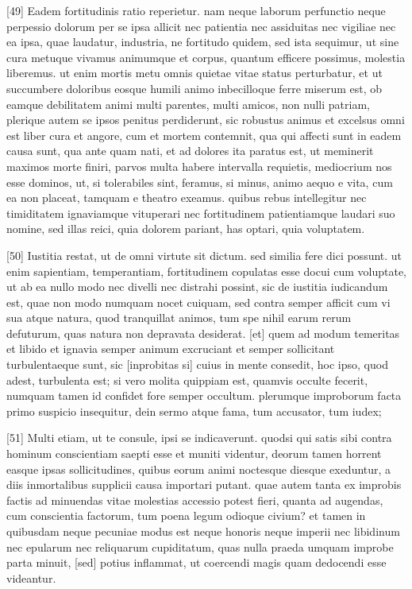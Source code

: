 \documentclass{article}
\begin{document}
[49] Eadem fortitudinis ratio reperietur. nam neque laborum perfunctio neque perpessio dolorum per se ipsa allicit nec patientia nec assiduitas nec vigiliae nec ea ipsa, quae laudatur, industria, ne fortitudo quidem, sed ista sequimur, ut sine cura metuque vivamus animumque et corpus, quantum efficere possimus, molestia liberemus. ut enim mortis metu omnis quietae vitae status perturbatur, et ut succumbere doloribus eosque humili animo inbecilloque ferre miserum est, ob eamque debilitatem animi multi parentes, multi amicos, non nulli patriam, plerique autem se ipsos penitus perdiderunt, sic robustus animus et excelsus omni est liber cura et angore, cum et mortem contemnit, qua qui affecti sunt in eadem causa sunt, qua ante quam nati, et ad dolores ita paratus est, ut meminerit maximos morte finiri, parvos multa habere intervalla requietis, mediocrium nos esse dominos, ut, si tolerabiles sint, feramus, si minus, animo aequo e vita, cum ea non placeat, tamquam e theatro exeamus. quibus rebus intellegitur nec timiditatem ignaviamque vituperari nec fortitudinem patientiamque laudari suo nomine, sed illas reici, quia dolorem pariant, has optari, quia voluptatem.

[50] Iustitia restat, ut de omni virtute sit dictum. sed similia fere dici possunt. ut enim sapientiam, temperantiam, fortitudinem copulatas esse docui cum voluptate, ut ab ea nullo modo nec divelli nec distrahi possint, sic de iustitia iudicandum est, quae non modo numquam nocet cuiquam, sed contra semper afficit cum vi sua atque natura, quod tranquillat animos, tum spe nihil earum rerum defuturum, quas natura non depravata desiderat. [et] quem ad modum temeritas et libido et ignavia semper animum excruciant et semper sollicitant turbulentaeque sunt, sic [inprobitas si] cuius in mente consedit, hoc ipso, quod adest, turbulenta est; si vero molita quippiam est, quamvis occulte fecerit, numquam tamen id confidet fore semper occultum. plerumque improborum facta primo suspicio insequitur, dein sermo atque fama, tum accusator, tum iudex;

[51] Multi etiam, ut te consule, ipsi se indicaverunt. quodsi qui satis sibi contra hominum conscientiam saepti esse et muniti videntur, deorum tamen horrent easque ipsas sollicitudines, quibus eorum animi noctesque diesque exeduntur, a diis inmortalibus supplicii causa importari putant. quae autem tanta ex improbis factis ad minuendas vitae molestias accessio potest fieri, quanta ad augendas, cum conscientia factorum, tum poena legum odioque civium? et tamen in quibusdam neque pecuniae modus est neque honoris neque imperii nec libidinum nec epularum nec reliquarum cupiditatum, quas nulla praeda umquam improbe parta minuit, [sed] potius inflammat, ut coercendi magis quam dedocendi esse videantur.
\end{document}
